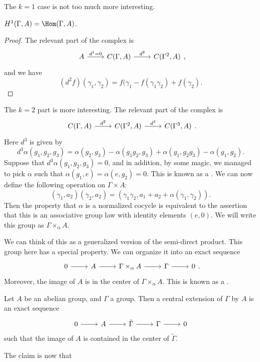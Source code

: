 \documentclass[a4paper]{article}
\begin{document}
The $k = 1$ case is not too much more interesting.
\begin{prop}
  $H^1(\Gamma, A) = \Hom(\Gamma, A)$.
\end{prop}

\begin{proof}
  The relevant part of the complex is
  \[
    \begin{tikzcd}
      A \ar[r, "d^1 = 0"] & C(\Gamma, A) \ar[r, "d^2"] & C(\Gamma^2, A)
    \end{tikzcd},
  \]
  and we have
  \[
    (d^2 f) (\gamma_1, \gamma_2) = f(\gamma_1 - f(\gamma_1 \gamma_2) + f(\gamma_2).
  \]
\end{proof}

The $k = 2$ part is more interesting. The relevant part of the complex is
\[
  \begin{tikzcd}
    C(\Gamma, A) \ar[r, "d^2"] & C(\Gamma^2, A) \ar[r, "d^3"] & C(\Gamma^3, A)
  \end{tikzcd}.
\]
Here $d^3$ is given by
\[
  d^3 \alpha (g_1, g_2, g_3) = \alpha(g_2, g_3) - \alpha(g_1 g_2, g_3) + \alpha(g_1, g_2 g_3) - \alpha(g_1, g_2).
\]
Suppose that $d^3 \alpha (g_1, g_2, g_3) = 0$, and in addition, by some magic, we managed to pick $\alpha$ such that $\alpha(g_1, e) = \alpha(e, g_2) = 0$. This is known as a . We can now define the following operation on $\Gamma \times A$:
\[
  (\gamma_1, a_2)(\gamma_2, a_2) = (\gamma_1 \gamma_2, a_1 +a _2 + \alpha (\gamma_1, \gamma_2)).
\]
Then the property that $\alpha$ is a normalized cocycle is equivalent to the assertion that this is an associative group law with identity elements $(e, 0)$. We will write this group as $\Gamma \times_\alpha A$.

We can think of this as a generalized version of the semi-direct product. This group here has a special property. We can organize it into an exact sequence
\[
  \begin{tikzcd}
    0 \ar[r] & A \ar[r] & \Gamma \times_\alpha A \ar[r] & \Gamma \ar[r] & 0
  \end{tikzcd}.
\]
Moreover, the image of $A$ is in the center of $\Gamma \times_\alpha A$. This is known as a .
\begin{defi}
  Let $A$ be an abelian group, and $\Gamma$ a group. Then a central extension of $\Gamma$ by $A$ is an exact sequence
  \[
    \begin{tikzcd}
      0 \ar[r] & A \ar[r] & \tilde{\Gamma} \ar[r] & \Gamma \ar[r] & 0
    \end{tikzcd}
  \]
  such that the image of $A$ is contained in the center of $\tilde{\Gamma}$.
\end{defi}
The claim is now that
\end{document}
